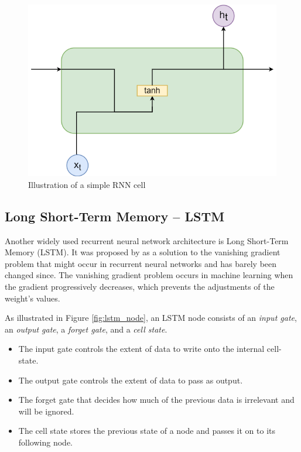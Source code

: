 \documentclass[nofilelist]{cslthse-msc}
\begin{document}
 \begin{figure}[H]
    \centering
    \includegraphics[scale=0.35]{msccls/explanatory_images/rnn.png}
    \caption{Illustration of a simple RNN cell}
    \label{fig:rnn_node}
\end{figure}



\subsection{Long Short-Term Memory -- LSTM}

Another widely used recurrent neural network architecture is Long Short-Term Memory (LSTM). It was proposed by \citet{hochreiter1997} as a solution to the vanishing gradient problem that might occur in recurrent neural networks and has barely been changed since. The vanishing gradient problem occurs in machine learning when the gradient progressively decreases, which prevents the adjustments of the weight's values. 


As illustrated in Figure \ref{fig:lstm_node}, an LSTM node consists of an \textit{input gate}, an \textit{output gate}, a \textit{forget gate}, and a \textit{cell state}. 
\begin{itemize}
    \item The input gate controls the extent of data to write onto the internal cell-state.
    \item The output gate controls the extent of data to pass as output. 
    \item The forget gate that decides how much of the previous data is irrelevant and will be ignored. 
    \item The cell state stores the previous state of a node and passes it on to its following node. 
\end{itemize}
\end{document}

